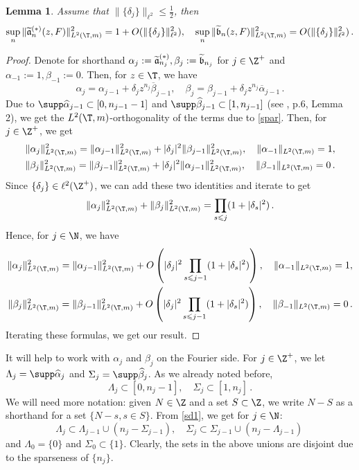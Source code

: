 \documentclass[twoside,a4paper]{amsart}
\def\le{\leqslant}
\newtheorem{lemma}[theorem]{Lemma}
\theoremstyle{remark}
\numberwithin{equation}{section}
\begin{document}
\begin{lemma}Assume that $\|\{\delta_j\}\|_{\ell^2}\le \frac 12$, then
\[
\sup_n\|\widetilde{\frak{a}}_n^{(*)}(z,F)\|_{L^2(\T,m)}^2=1+O(\|\{\delta_j\}\|_{\ell^2}^2),\quad \sup_n\|\widetilde{\frak{b}}_n(z,F)\|_{L^2(\T,m)}^2=O(\|\{\delta_j\}\|_{\ell^2}^2)\,.
\]
\end{lemma}
\begin{proof}
Denote for shorthand $\alpha_j:=\widetilde{\frak{a}}^{(*)}_{n_j},\beta_j:=\widetilde{\frak{b}}_{n_j}$ for $j\in \Z^+$ and $\alpha_{-1}:=1,\beta_{-1}:=0$. Then, for $z\in \T$, we have
\begin{equation}\label{sd1}
\alpha_{j}=\alpha_{j-1}+{\delta}_j z^{n_j}\overline{\beta}_{j-1}, \quad \beta_{j}=\beta_{j-1}+\delta_j z^{n_j}\overline{\alpha}_{j-1}\,.
\end{equation}
Due to $\supp \widehat\alpha_{j-1}\subset [0,n_{j-1}-1]$ and $\supp \widehat\beta_{j-1}\subset [1,n_{j-1}]$ (see \cite{tt}, p.6, Lemma 2), we get the $L^2(\T,m)$-orthogonality of the terms due to \eqref{spar}. Then, for $j\in \Z^+$, we get
\begin{eqnarray}
\|\alpha_j\|_{L^2(\T,m)}^2=\|\alpha_{j-1}\|_{L^2(\T,m)}^2+|\delta_j|^2\|\beta_{j-1}\|_{L^2(\T,m)}^2, \quad \|\alpha_{-1}\|_{L^2(\T,m)}=1,\\
\|\beta_j\|_{L^2(\T,m)}^2=\|\beta_{j-1}\|_{L^2(\T,m)}^2+|\delta_j|^2\|\alpha_{j-1}\|_{L^2(\T,m)}^2, \quad \|\beta_{-1}\|_{L^2(\T,m)}=0\,.
\end{eqnarray}
Since $\{\delta_j\}\in \ell^2(\Z^+)$, we can add these two identities and iterate to get 
\[
\|\alpha_j\|_{L^2(\T,m)}^2+\|\beta_j\|_{L^2(\T,m)}^2=\prod_{s\le j}(1+|\delta_s|^2)\,.
\]
Hence, for $j\in \N$, we have
\begin{eqnarray}
\|\alpha_j\|_{L^2(\T,m)}^2= \|\alpha_{j-1}\|_{L^2(\T,m)}^2+O\left(|\delta_j|^2\prod_{s\le j-1}(1+|\delta_s|^2)\right), \quad \|\alpha_{-1}\|_{L^2(\T,m)}=1,\\
\|\beta_j\|_{L^2(\T,m)}^2= \|\beta_{j-1}\|_{L^2(\T,m)}^2+O\left(|\delta_j|^2\prod_{s\le j-1}(1+|\delta_s|^2)\right), \quad \|\beta_{-1}\|_{L^2(\T,m)}=0\,.
\end{eqnarray}
Iterating these formulas, we get  our result.
\end{proof}
It will help to work with $\alpha_j$ and $\beta_j$ on the Fourier side. 
For $j\in \Z^+$, we let $\Lambda_j=\supp \widehat\alpha_j$ and $\Sigma_j=\supp \widehat\beta_j$.  As we already noted before, 
\[
\Lambda_j\subset [0,n_j-1], \quad \Sigma_j\subset [1,n_j]\,.
\] We will need more notation: given $N\in \Z$ and a set $S\subset \Z$, we write $N-S$ as a shorthand for a set $\{N-s, s\in S\}$.  From \eqref{sd1}, we get for $j\in \N$:
\begin{equation}\label{le}
\Lambda_j\subset \Lambda_{j-1}\cup (n_j-\Sigma_{j-1}), \quad \Sigma_j\subset \Sigma_{j-1}\cup (n_j-\Lambda_{j-1})\,
\end{equation}
and $\Lambda_0=\{0\}$ and $\Sigma_0\subset \{1\}$. Clearly, the sets in the above unions are disjoint due to the sparseness of $\{n_j\}$. 
\end{document}

